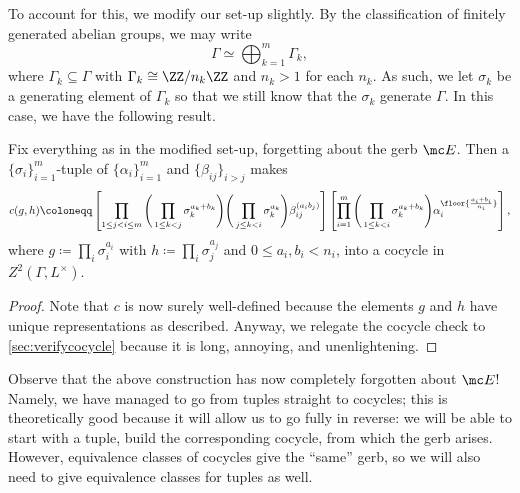 \documentclass{article}
\numberwithin{equation}{section}
\begin{document}
To account for this, we modify our set-up slightly. By the classification of finitely generated abelian groups, we may write
\[\Gamma\simeq\bigoplus_{k=1}^m\Gamma_k,\]
where $\Gamma_k\subseteq\Gamma$ with $\Gamma_k\cong\ZZ/n_k\ZZ$ and $n_k>1$ for each $n_k$. As such, we let $\sigma_k$ be a generating element of $\Gamma_k$ so that we still know that the $\sigma_k$ generate $\Gamma$. In this case, we have the following result.
\begin{theorem} \label{thm:getcocycle}
	Fix everything as in the modified set-up, forgetting about the gerb $\mc E$. Then a $\{\sigma_i\}_{i=1}^m$-tuple of $\{\alpha_i\}_{i=1}^m$ and $\{\beta_{ij}\}_{i>j}$ makes
	\[c(g,h)\coloneqq\left[\prod_{1\le j<i\le m}\Bigg(\prod_{1\le k<j}\sigma_k^{a_k+b_k}\Bigg)\Bigg(\prod_{j\le k<i}\sigma_k^{a_k}\Bigg)\beta_{ij}^{(a_ib_j)}\right]\left[\prod_{i=1}^m\Bigg(\prod_{1\le k<i}\sigma_k^{a_k+b_k}\Bigg)\alpha_i^{\floor{\frac{a_i+b_i}{n_i}}}\right],\]
	where $g\coloneqq\prod_i\sigma_i^{a_i}$ with $h\coloneqq\prod_i\sigma_j^{a_j}$ and $0\le a_i,b_i<n_i$, into a cocycle in $Z^2(\Gamma,L^\times)$.
\end{theorem}
\begin{proof}
	Note that $c$ is now surely well-defined because the elements $g$ and $h$ have unique representations as described. Anyway, we relegate the cocycle check to \autoref{sec:verifycocycle} because it is long, annoying, and unenlightening.
\end{proof}
Observe that the above construction has now completely forgotten about $\mc E$! Namely, we have managed to go from tuples straight to cocycles; this is theoretically good because it will allow us to go fully in reverse: we will be able to start with a tuple, build the corresponding cocycle, from which the gerb arises. However, equivalence classes of cocycles give the ``same'' gerb, so we will also need to give equivalence classes for tuples as well.
\end{document}
